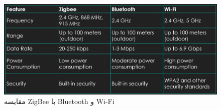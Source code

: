 \begin{figure}[H]
    \centering
    \includegraphics[width=1\linewidth]{images/comparison.jpg}
    \caption{مقایسه ZigBee با Bluetooth و Wi-Fi }
    \label{fig:h}
\end{figure}